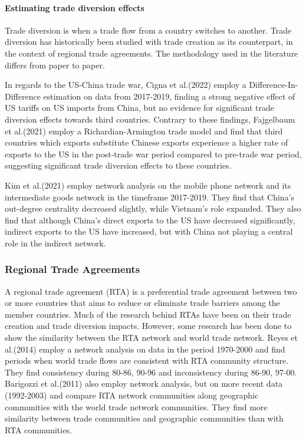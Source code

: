 \documentclass[a4paper, 12pt]{article}
\begin{document}
\paragraph{Estimating trade diversion effects}
Trade diversion is when a trade flow from a country switches to another. 
Trade diversion has historically been studied with trade creation as its counterpart, in the context of regional trade agreements. 
The methodology used in the literature differs from paper to paper.\par
In regards to the US-China trade war,
Cigna et al.(2022)\cite{cigna2022} employ a Difference-In-Difference estimation on data from 2017-2019, finding a strong negative effect of US tariffs on US imports from China, but no evidence for significant trade diversion effects towards third countries.
Contrary to these findings, Fajgelbaum et al.(2021)\cite{fajgelbaum2021} employ a Richardian-Armington trade model and find that third countries which exports substitute Chinese exports experience a higher rate of exports to the US  in the post-trade war period compared to pre-trade war period, suggesting significant trade diversion effects to these countries.\par
Kim et al.(2021)\cite{kim2021} employ network analysis on the mobile phone network and its intermediate goods network in the timeframe 2017-2019.
They find that China's out-degree centrality decreased slightly, while Vietnam's role expanded.
They also find that although China’s direct exports to the US have decreased significantly, indirect exports to the US have increased, but with China not playing a central role in the indirect network.

\subsubsection{Regional Trade Agreements}
A regional trade agreement (RTA) is a preferential trade agreement between two or more countries that aims to reduce or eliminate trade barriers among the member countries. 
Much of the research behind RTAs have been on their trade creation and trade diversion impacts. 
However, some research has been done to show the similarity between the RTA network and world trade network.
Reyes et al.(2014)\cite{reyes2014} employ a network analysis on data in the period 1970-2000 and find periods when world trade flows are consistent with RTA community structure.
They find consistency during 80-86, 90-96 and inconsistency during 86-90, 97-00.
Barigozzi et al.(2011)\cite{barigozzi2011} also employ network analysis, but on more recent data (1992-2003) and compare RTA network communities along geographic communities with the world trade network communities.
They find more similarity between trade communities and geographic communities than with RTA communities.
\end{document}

